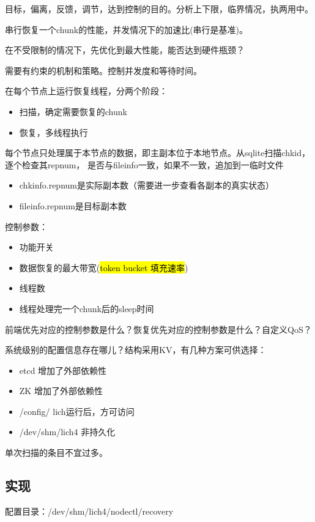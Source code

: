 目标，偏离，反馈，调节，达到控制的目的。分析上下限，临界情况，执两用中。

串行恢复一个chunk的性能，并发情况下的加速比(串行是基准)。

在不受限制的情况下，先优化到最大性能，能否达到硬件瓶颈？

需要有约束的机制和策略。控制并发度和等待时间。

在每个节点上运行恢复线程，分两个阶段：
\begin{itemize}
\item 扫描，确定需要恢复的chunk
\item 恢复，多线程执行
\end{itemize}

每个节点只处理属于本节点的数据，即主副本位于本地节点。从sqlite扫描chkid，逐个检查其repnum，
是否与fileinfo一致，如果不一致，追加到一临时文件
\begin{itemize}
\item chkinfo.repnum是实际副本数（需要进一步查看各副本的真实状态）
\item fileinfo.repnum是目标副本数
\end{itemize}

控制参数：
\begin{itemize}
\item 功能开关
\item 数据恢复的最大带宽(\hl{token bucket 填充速率})
\item 线程数
\item 线程处理完一个chunk后的sleep时间
\end{itemize}

前端优先对应的控制参数是什么？恢复优先对应的控制参数是什么？自定义QoS？

系统级别的配置信息存在哪儿？结构采用KV，有几种方案可供选择：
\begin{itemize}
\item etcd           增加了外部依赖性
\item ZK             增加了外部依赖性
\item /config/       lich运行后，方可访问
\item /dev/shm/lich4 非持久化
\end{itemize}

单次扫描的条目不宜过多。

\subsection{实现}

配置目录：/dev/shm/lich4/nodectl/recovery

